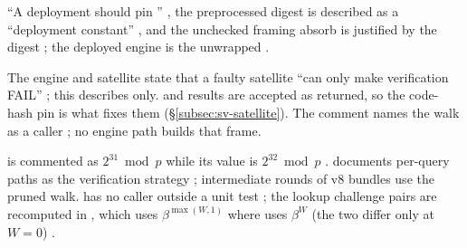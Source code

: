 \begin{specdelta}
\label{delta:sv-pin}
``A deployment should pin ''
, the preprocessed digest is described as a
``deployment constant'' , and the unchecked framing
absorb is justified by the  digest
; the deployed engine is the unwrapped
  .
\end{specdelta}

\begin{specdelta}
\label{delta:sv-trust}
The engine and satellite state that a faulty satellite ``can only make
verification FAIL''  ;
this describes  only.  and  results are
accepted as returned, so the code-hash pin is what fixes them
(\S\ref{subsec:sv-satellite}). The  comment names the
 walk as a caller ; no engine path
builds that frame.
\end{specdelta}

\begin{specdelta}[Minor]
\label{delta:sv-minor}
 is commented as $2^{31} \bmod p$ while its value
 is $2^{32} \bmod p$ .
 documents per-query paths as the verification strategy
; intermediate rounds of v8 bundles use the pruned
walk.  has no caller outside a unit test
; the lookup
challenge pairs are recomputed in , which uses
$\beta^{\max(W,1)}$ where  uses $\beta^{W}$ (the two differ only
at $W=0$)  .
\end{specdelta}

